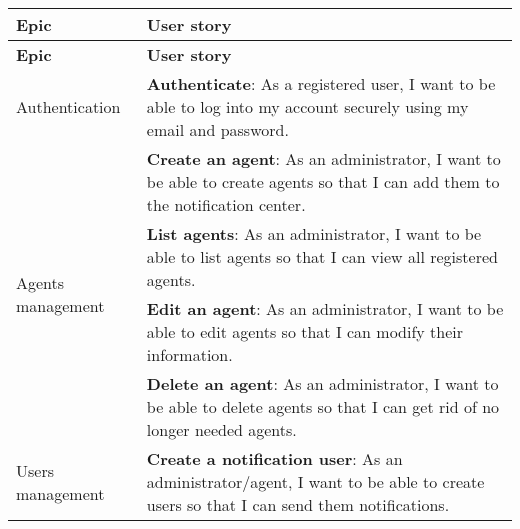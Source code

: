 \begin{longtable}{ | m{}  | m{} | }
      \hline
      \textbf{Epic}                                           & \textbf{User story}                                                                                                                                                                          \\
      \hline
      \endfirsthead
      \hline
      \textbf{Epic}                                           & \textbf{User story}                                                                                                                                                                          \\
      \hline
      \endhead
      \hline
      \endfoot
      \endlastfoot
      Authentication                                          & \textbf{Authenticate}: As a registered user, I want to be able to log into my account securely using my email and password.                                                                  \\
      \hline
      \multirow[t]{4}{5em}{Agents management}                 & \textbf{Create an agent}: As an administrator, I want to be able to create agents so that I can add them to the notification center.                                                         \\
      \cline{2-2}
                                                              & \textbf{List agents}: As an administrator, I want to be able to list agents so that I can view all registered agents.                                                                        \\
      \cline{2-2}
                                                              & \textbf{Edit an agent}: As an administrator, I want to be able to edit agents so that I can modify their information.                                                                        \\
      \cline{2-2}
                                                              & \textbf{Delete an agent}: As an administrator, I want to be able to delete agents so that I can get rid of no longer needed agents.                                                          \\
      \hline
      \multirow[t]{4}{5em}{Users management}                  & \textbf{Create a notification user}: As an administrator/agent, I want to be able to create users so that I can send them notifications.                                                     \\

\end{longtable}
